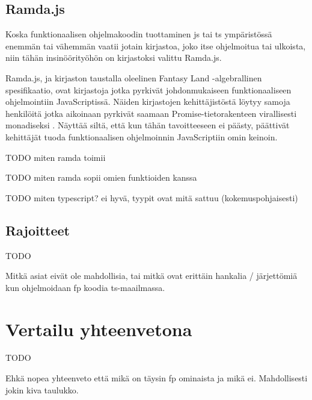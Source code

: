 \subsection{Ramda.js}

Koska funktionaalisen ohjelmakoodin tuottaminen \gls{js} tai \gls{ts} ympäristössä enemmän tai vähemmän vaatii jotain kirjastoa, joko itse ohjelmoitua tai ulkoista, niin tähän insinöörityöhön on kirjastoksi valittu Ramda.js.

Ramda.js, ja kirjaston taustalla oleelinen Fantasy Land -algebrallinen spesifikaatio, ovat kirjastoja jotka pyrkivät johdonmukaiseen funktionaaliseen ohjelmointiin JavaScriptissä. Näiden kirjastojen kehittäjistöstä löytyy samoja henkilöitä jotka aikoinaan pyrkivät saamaan Promise-tietorakenteen virallisesti monadiseksi \cite{ramda:contributors,fantasy-land:contributors,promises-spec-94}. Näyttää siltä, että kun tähän tavoitteeseen ei päästy, päättivät kehittäjät tuoda funktionaalisen ohjelmoinnin JavaScriptiin omin keinoin.

TODO miten ramda toimii

TODO miten ramda sopii omien funktioiden kanssa

TODO miten typescript? ei hyvä, tyypit ovat mitä sattuu (kokemuspohjaisesti)

\subsection{Rajoitteet}

TODO

Mitkä asiat eivät ole mahdollisia, tai mitkä ovat erittäin hankalia / järjettömiä kun ohjelmoidaan \gls{fp} koodia \gls{ts}-maailmassa.


\section{Vertailu yhteenvetona}

TODO

Ehkä nopea yhteenveto että mikä on täysin \gls{fp} ominaista ja mikä ei. Mahdollisesti jokin kiva taulukko.